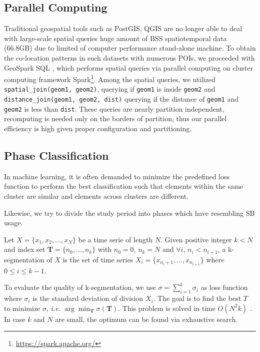 \documentclass[preprints,ijgi,submit,moreauthors]{Definitions/mdpi}
\begin{document}
\subsection{Parallel Computing}
Traditional geospatial tools such as PostGIS, QGIS are no longer able to deal with large-scale spatial queries huge amount of BSS spatiotemporal data (66.8GB) due to limited of computer performance stand-alone machine.
To obtain the co-location patterns in such datasets with numerous POIs, we proceeded with GeoSpark SQL \cite{huang2017geospark}, which performs spatial queries via parallel computing on cluster computing framework Spark\footnote{\url{https://spark.apache.org/}}.
Among the spatial queries, we utilized \texttt{spatial\_join(geom1, geom2)}, querying if \texttt{geom1} is inside \texttt{geom2} and \texttt{distance\_join(geom1, geom2, dist)} querying if the distance of \texttt{geom1} and \texttt{geom2} is less than \texttt{dist}.
These queries are nearly partition independent, recomputing is needed only on the borders of partition, thus our parallel efficiency is high given proper configuration and partitioning.

\subsection{Phase Classification}\label{sec:phase_classification}
In machine learning, it is often demanded to minimize the predefined loss function to perform the best classification such that elements within the same cluster are similar and elements across clusters are different.

Likewise, we try to divide the study period into phases which have resembling SB usage.

\begin{Definition}[k-segmentation]
Let $X=\{x_1,x_2,\ldots,x_N\}$ be a time serie of length $N$.
Given positive integer $k<N$ and index set $\mathbf{T}=\{n_0,\ldots,n_k\}$ with $n_0=0$, $n_k=N$ and $\forall i$, $n_i<n_{i+1}$, a k-segmentation of $X$ is the set of time series $X_i=\{x_{n_i+1},\ldots,x_{n_{i+1}}\}$ where $0\leq i\leq k-1$.
\end{Definition}

To evaluate the quality of k-segmentation, we use $\sigma=\sum_{i=1}^{k}{\sigma_i}$ as loss function where $\sigma_i$ is the standard deviation of division $X_i$. %
The goal is to find the best $T$ to minimize $\sigma$, \textit{i.e.} $\arg\min_{\mathbf{T}}\sigma(\mathbf{T})$.
This problem is solved in time $O(N^2k)$ \cite{terzi2006efficient}.
In case $k$ and $N$ are small, the optimum can be found via exhaustive search.
\end{document}

